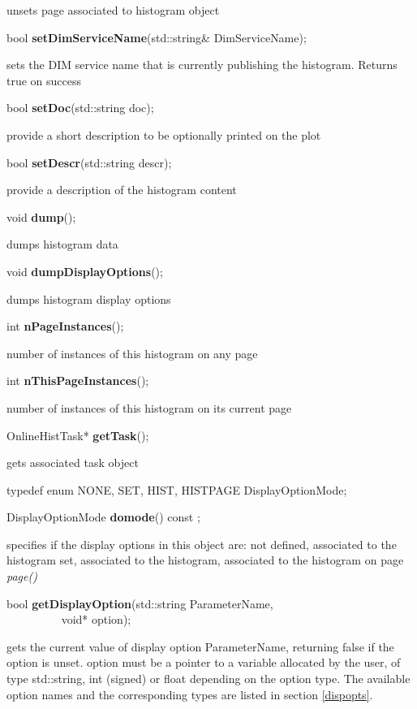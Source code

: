  unsets page associated to histogram object


\item    bool {\bf setDimServiceName}(std::string\& DimServiceName);


 sets the DIM service name that is currently publishing the histogram. Returns true on success


\item    bool {\bf setDoc}(std::string doc);


 provide a short description to be optionally printed on the plot 


\item    bool {\bf setDescr}(std::string descr);


 provide a  description of the histogram content 


\item    void {\bf dump}();


 dumps histogram data


\item    void {\bf dumpDisplayOptions}();


 dumps histogram display options


\item    int {\bf nPageInstances}();


 number of instances of this histogram on any page


\item    int {\bf nThisPageInstances}();


 number of instances of this histogram on its current page


\item    OnlineHistTask* {\bf getTask}();


 gets associated task object


\item   typedef enum { NONE, SET, HIST, HISTPAGE } DisplayOptionMode;
\item    DisplayOptionMode {\bf domode}() const ;

 specifies if the display options in this object are: not defined,
 associated to the histogram set, associated to the histogram,
 associated to the histogram on  page {\it page()}


\item    bool {\bf getDisplayOption}(std::string ParameterName,\\\mbox{}~~~~~~~~~
			void* option);

 gets the current value of display option ParameterName, returning false if
 the option is unset.
 option must be a pointer to a variable allocated by the user, of type 
 std::string, int (signed) or float depending on the option type.
 The available option names and the corresponding types are listed 
 in section \ref{dispopts}.



